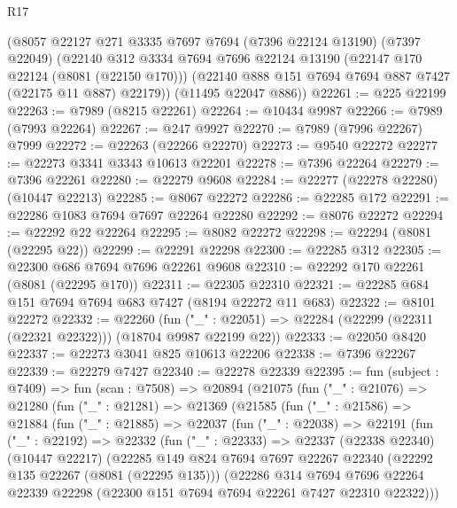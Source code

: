 \begin{lexlean}{R17}
\begin{coremodule}
    (@8057
      @22127
      @271
      @3335
      @7697
      @7694
      (@7396 @22124 @13190)
      (@7397 @22049)
      (@22140
        @312
        @3334
        @7694
        @7696
        @22124
        @13190
        (@22147 @170 @22124 (@8081 (@22150 @170)))
        (@22140 @888 @151 @7694 @7694 @887 @7427 (@22175 @11 @887) @22179))
      (@11495 @22047 @886))
@22261 := @225 @22199
@22263 := @7989 (@8215 @22261)
@22264 := @10434 @9987
@22266 := @7989 (@7993 @22264)
@22267 := @247 @9927
@22270 := @7989 (@7996 @22267) @7999
@22272 := @22263 (@22266 @22270)
@22273 := @9540 @22272
@22277 := @22273 @3341 @3343 @10613 @22201
@22278 := @7396 @22264
@22279 := @7396 @22261
@22280 := @22279 @9608
@22284 := @22277 (@22278 @22280) (@10447 @22213)
@22285 := @8067 @22272
@22286 := @22285 @172
@22291 := @22286 @1083 @7694 @7697 @22264 @22280
@22292 := @8076 @22272
@22294 := @22292 @22 @22264
@22295 := @8082 @22272
@22298 := @22294 (@8081 (@22295 @22))
@22299 := @22291 @22298
@22300 := @22285 @312
@22305 := @22300 @686 @7694 @7696 @22261 @9608
@22310 := @22292 @170 @22261 (@8081 (@22295 @170))
@22311 := @22305 @22310
@22321 := @22285 @684 @151 @7694 @7694 @683 @7427 (@8194 @22272 @11 @683)
@22322 := @8101 @22272
@22332 := @22260
    (fun ("_" : @22051) => @22284 (@22299 (@22311 (@22321 @22322))) (@18704 @9987 @22199 @22))
@22333 := @22050 @8420
@22337 := @22273 @3041 @825 @10613 @22206
@22338 := @7396 @22267
@22339 := @22279 @7427
@22340 := @22278 @22339
@22395 := fun (subject : @7409) =>
  fun (scan : @7508) =>
  @20894
    (@21075
      (fun ("_" : @21076) =>
      @21280
        (fun ("_" : @21281) =>
        @21369
          (@21585
            (fun ("_" : @21586) =>
            @21884
              (fun ("_" : @21885) =>
              @22037
                (fun ("_" : @22038) =>
                @22191
                  (fun ("_" : @22192) =>
                  @22332
                    (fun ("_" : @22333) =>
                    @22337
                      (@22338 @22340)
                      (@10447 @22217)
                      (@22285
                        @149
                        @824
                        @7694
                        @7697
                        @22267
                        @22340
                        (@22292 @135 @22267 (@8081 (@22295 @135)))
                        (@22286
                          @314
                          @7694
                          @7696
                          @22264
                          @22339
                          @22298
                          (@22300 @151 @7694 @7694 @22261 @7427 @22310 @22322)))

\end{coremodule}
\end{lexlean}
